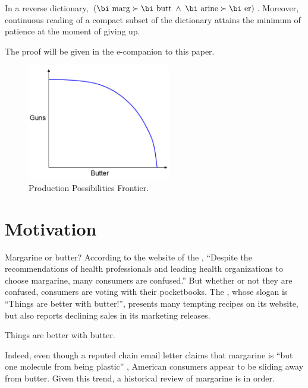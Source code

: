 \documentclass[opre,nonblindrev]{informs3}
\begin{document}
\begin{theorem}
\label{marg-butt-th}
In a reverse dictionary, $(\mbox{\bi marg}\succ\mbox{\bi butt\/}\; \land\;  
\mbox{\bi arine}\succ\mbox{\bi er})$.
Moreover, continuous reading of a compact subset of the dictionary
attains the minimum of patience at the moment of giving up.
\end{theorem}

The proof will be given in the e-companion to this paper.



\begin{figure}[t]
\begin{center}
\includegraphics[height=2in]{Sample-Figure}
\caption{Production Possibilities Frontier.} \label{frontier}
\end{center}
\end{figure}

\section{Motivation}

Margarine or butter? According to the website of the 
\cite{namm}, ``Despite the
recommendations of health professionals and leading health
organizations to choose margarine, many consumers are confused.''
But whether or not they are confused, consumers are voting with
their pocketbooks.  The 
\cite{abi}, whose
slogan is ``Things are better with butter!'', presents many tempting
recipes on its website, but also reports declining sales in its
marketing releases.  

\begin{hypothesis}
Things are better with butter.
\end{hypothesis}

Indeed, even though a reputed chain email letter claims that margarine is ``but 
one molecule from being plastic'' 
\citep{btc}, 
American consumers appear to be
sliding away from butter. Given this trend, a historical review of
margarine is in order.
\end{document}

